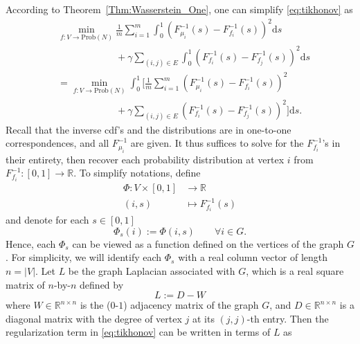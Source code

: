 \documentclass[letterpaper]{article} %
\begin{document}
According to  Theorem~\ref{Thm:Wasserstein_One}, one can simplify \eqref{eq:tikhonov} as 
\begin{equation*}
  \begin{aligned}
    &\min_{f:V\to \mathrm{Prob}(N)}\frac{1}{m}\sum_{i=1}^m \int_0^1 \left(F_{\mu_i}^{-1}\left( s \right)-F_{f_i}^{-1}\left( s \right)\right)^2\mathrm{d}s \\
    &\qquad \qquad\qquad +\gamma\sum_{\left( i,j \right)\in E}\int_0^1 \left( F_{f_i}^{-1}\left( s \right)-F_{f_j}^{-1}\left( s \right) \right)^2\mathrm{d}s\\
    &=\min_{f:V\to \mathrm{Prob}(N)}\int_0^1 \Big[ \frac{1}{m} \sum_{i=1}^m \left(F_{\mu_i}^{-1}\left( s \right)-F_{f_i}^{-1}\left( s \right)\right)^2\\
    &\qquad \qquad \qquad +\gamma \sum_{\left( i,j \right)\in E}\left( F_{f_i}^{-1}\left( s \right)-F_{f_j}^{-1}\left( s \right) \right)^2  \Big]\mathrm{d}s.
  \end{aligned}
  \end{equation*}
Recall that the inverse cdf's and the distributions are in one-to-one correspondences, and all $F_{\mu_i}^{-1}$ are given. It thus suffices to solve for the $F_{f_i}^{-1}$'s in their entirety, then recover each probability distribution at vertex $i$ from $F_{f_i}^{-1}:[0,1]\rightarrow\mathbb{R}$. To simplify notations, define
\begin{equation*}
  \begin{aligned}
    \Phi:V\times \left[ 0,1 \right]&\rightarrow \mathbb{R}\\
    \left( i,s \right)&\mapsto F_{f_i}^{-1}\left( s \right)
  \end{aligned}
\end{equation*}
and denote for each $s\in \left[ 0,1 \right]$
\begin{equation*}
  \Phi_s \left( i \right):=\Phi \left( i,s \right)\qquad\forall i\in G.
\end{equation*}
Hence, each $\Phi_s$ can be viewed as a function defined on the vertices of the graph $G$. For simplicity, we will identify each $\Phi_s$ with a real column vector of length $n=\left| V \right|$. Let $L$ be the graph Laplacian associated with $G$, which is a real square matrix of $n$-by-$n$ defined by
\begin{equation*}
  L:=D-W
\end{equation*}
where $W\in \mathbb{R}^{n\times n}$ is the ($0$-$1$) adjacency matrix of the graph $G$, and $D\in \mathbb{R}^{n\times n}$ is a diagonal matrix with the degree of vertex $j$ at its $\left( j,j \right)$-th entry. Then the regularization term in \eqref{eq:tikhonov} can be written in terms of $L$ as
\end{document}
